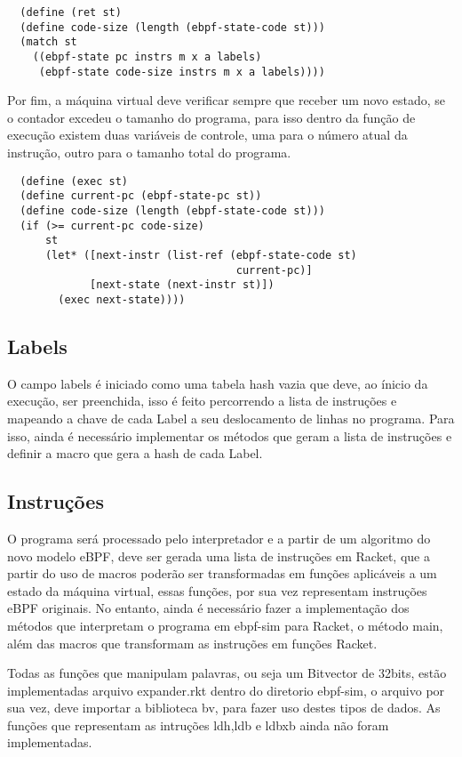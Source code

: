 \documentclass[paper=a4, fontsize=12pt]{article}
\theoremstyle{definition}
\begin{document}
\begin{lstlisting}
  (define (ret st)
  (define code-size (length (ebpf-state-code st)))
  (match st
    ((ebpf-state pc instrs m x a labels)
     (ebpf-state code-size instrs m x a labels))))
\end{lstlisting}

Por fim, a máquina virtual deve verificar sempre que receber um novo estado, se o contador
excedeu o tamanho do programa, para isso dentro da função de execução existem duas variáveis de
controle, uma para o número atual da instrução, outro para o tamanho total do programa.

\begin{lstlisting}
  (define (exec st)
  (define current-pc (ebpf-state-pc st))
  (define code-size (length (ebpf-state-code st)))
  (if (>= current-pc code-size)
      st
      (let* ([next-instr (list-ref (ebpf-state-code st) 
                                    current-pc)]
             [next-state (next-instr st)])
        (exec next-state))))
\end{lstlisting}

\subsection{Labels}

O campo labels é iniciado como uma tabela hash vazia que deve, ao ínicio da execução,
ser preenchida, isso é feito percorrendo a lista de instruções e mapeando a chave de
cada Label a seu deslocamento de linhas no programa. Para isso, ainda é necessário 
implementar os métodos que geram a lista de instruções e definir a macro que gera a
hash de cada Label.

\subsection{Instruções}

O programa será processado pelo interpretador e a partir de um algoritmo do novo
modelo eBPF, deve ser gerada uma lista de instruções em Racket, que a partir do uso de macros
poderão ser transformadas em funções aplicáveis a um estado da máquina virtual, essas funções,
por sua vez representam instruções eBPF originais. No entanto, ainda é necessário fazer a implementação
dos métodos  que interpretam o programa em ebpf-sim para Racket, o método main, além das macros
que transformam as instruções em funções Racket. 

Todas as funções que manipulam palavras, ou seja um Bitvector de 32bits, estão implementadas
arquivo expander.rkt dentro do diretorio ebpf-sim, o arquivo por sua vez, deve importar a biblioteca 
bv, para fazer uso destes tipos de dados. As funções que representam as intruções ldh,ldb e ldbxb
ainda não foram implementadas.
\end{document}

